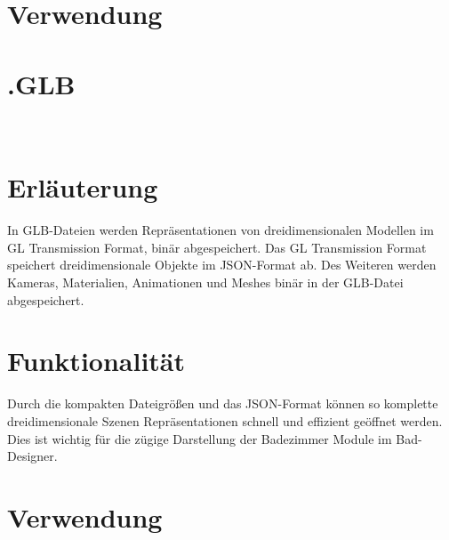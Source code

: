 \section*{Verwendung}

\clearpage
\newpage

\section{.GLB}
~\cite{GLB_01}
\section*{Erläuterung}
In GLB-Dateien werden Repräsentationen von dreidimensionalen Modellen im GL Transmission Format, binär abgespeichert. Das GL Transmission Format speichert dreidimensionale Objekte im JSON-Format ab. Des Weiteren werden Kameras, Materialien, Animationen und Meshes binär in der GLB-Datei abgespeichert. 
\section*{Funktionalität}
Durch die kompakten Dateigrößen und das JSON-Format können so komplette dreidimensionale Szenen Repräsentationen schnell und effizient geöffnet werden. Dies ist wichtig für die zügige Darstellung der Badezimmer Module im Bad-Designer.


\section*{Verwendung}




